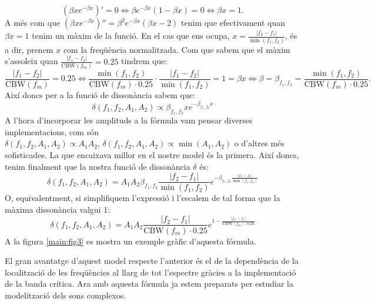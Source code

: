 \documentclass{article}
\theoremstyle{definition}
\newcommand{\0}{\ensuremath{\vb{0}}}
\begin{document}
$$\left(\beta xe^{-\beta x}\right)'=0\iff \beta e^{-\beta x}(1-\beta x)=0\iff\beta x=1.$$ A més com que $\left(\beta xe^{-\beta x}\right)''=\beta^2e^{-\beta x}(\beta x-2)$ tenim que efectivament quan $\beta x=1$ tenim un màxim de la funció.
En el cas que ens ocupa, $x=\frac{|f_2-f_1|}{\min(f_1,f_2)}$, és a dir, prenem $x$ com la freqüència normalitzada. Com que sabem que el màxim s'assoleix quan $\frac{|f_1-f_2|}{\text{CBW}(f_m)}=0.25$ tindrem que:
$$\frac{|f_1-f_2|}{\text{CBW}(f_m)}=0.25\iff\frac{\min(f_1, f_2)}{\text{CBW}(f_m)\cdot 0.25}\cdot\frac{|f_1-f_2|}{\min(f_1, f_2)}=1=\beta x\iff\beta=\beta_{f_1,f_2}=\frac{\min(f_1, f_2)}{\text{CBW}(f_m)\cdot 0.25}.$$
Així doncs per a la funció de dissonància sabem que: $$\delta(f_1,f_2,A_1,A_2)\propto\beta_{f_1,f_2}xe^{-\beta_{f_1,f_2}x}$$ A l'hora d'incorporar les amplituds a la fórmula vam pensar diverses implementacions, com són \\$\delta(f_1,f_2,A_1,A_2)\propto A_1A_2$, $\delta(f_1,f_2,A_1,A_2)\propto \min(A_1, A_2)$ o d'altres més sofisticades. La que encaixava millor en el nostre model és la primera. Així doncs, tenim finalment que la nostra funció de dissonància $\delta$ és:$$\delta(f_1,f_2,A_1,A_2)=A_1A_2\beta_{f_1,f_2}\frac{|f_2-f_1|}{\min(f_1,f_2)}e^{-\beta_{f_1,f_2}\frac{|f_2-f_1|}{\min(f_1,f_2)}}$$
O, equivalentment, si simplifiquem l'expressió i l'escalem de tal forma que la màxima dissonància valgui 1: 
\begin{equation}
    \delta(f_1,f_2,A_1,A_2)=A_1A_2\frac{|f_2-f_1|}{\text{CBW}(f_m)\cdot 0.25}e^{1-\frac{|f_2-f_1|}{\text{CBW}(f_m)\cdot 0.25}}
    \label{for:dissonancia}
\end{equation}
A la figura \ref{main:fig3} es mostra un exemple gràfic d'aquesta fórmula.
\begin{center}
    
    \label{main:fig3}
\end{center}
El gran avantatge d'aquest model respecte l'anterior és el de la dependència de la localització de les freqüències al llarg de tot l'espectre gràcies a la implementació de la banda crítica. Ara amb aquesta fórmula ja estem preparats per estudiar la modelització dels sons complexos.
\end{document}
